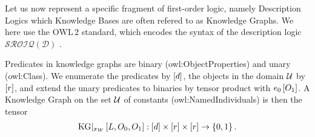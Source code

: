 


\label{sec:kgRepresentation}

Let us now represent a specific fragment of first-order logic, namely Description Logics which Knowledge Bases are often refered to as Knowledge Graphs.
We here use the $\mathrm{OWL\,2}$ standard, which encodes the syntax of the description logic $\mathcal{SROIQ(D)}$ \cite{rudolph_foundations_2011}.


Predicates in knowledge graphs are binary (owl:ObjectProperties) and unary (owl:Class).
We enumerate the predicates by $[d]$, the objects in the domain $\mathcal{U}$ by $[r]$, and extend the unary predicates to binaries by tensor product with $e_{0}\left[O_{1}\right]$.
A Knowledge Graph on the set $\mathcal{U}$ of constants (owl:NamedIndividuals) is then the tensor
\begin{align*}
    \mathrm{KG}|_{x_{W}}\left[L,O_{0},O_{1}\right] : [d] \times [r] \times [r] \rightarrow \{0,1\} \, .
\end{align*}


